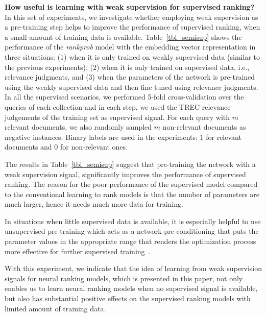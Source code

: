 \documentclass[sigconf]{acmart}
\newcommand{\modelthree}{\textit{rank\-prob} model\xspace}
\newcommand{\feedthree}{embedding vector representation\xspace}
\def\:{\hskip0pt} %
\newcommand{\mypar}[1]{\vspace*{-0.1ex}\medskip\noindent\textbf{#1}~}
\newcommand{\alexi}[1]{\textcolor{cyan}{{\bf [Alexi: }{\em #1}{\bf ]}}}
\begin{document}
\mypar{How useful is learning with weak supervision for supervised ranking?}
%
In this set of experiments, we investigate whether employing weak supervision as a pre-training step helps to improve the performance of supervised ranking, when a small amount of training data is available. Table~\ref{tbl_semisup} shows the performance of the \modelthree with the \feedthree in three situations: (1) when it is only trained on weakly supervised data (similar to the previous experiments), (2) when it is only trained on supervised data, i.e., relevance judgments, and (3) when the parameters of the network is pre-trained using the weakly supervised data and then fine tuned using relevance judgments.
%
In all the supervised scenarios, we performed 5-fold cross-\:validation over the queries of each collection and in each step, we used the TREC relevance judgements of the training set as supervised signal. For each query with $m$ relevant documents, we also randomly sampled $m$ non-relevant documents as negative instances. Binary labels are used in the experiments: $1$ for relevant documents and $0$ for non-relevant ones.

The results in Table~\ref{tbl_semisup} suggest that pre-training the network with a weak supervision signal, significantly improves the performance of supervised ranking.
%
The reason for the poor performance of the supervised model compared to the conventional learning to rank models is that the number of parameters are much larger, hence it needs much more data for training.

In situations when little supervised data is available, it is especially helpful to use unsupervised pre-training which acts as a network pre-conditioning that puts the parameter values in the appropriate range that renders the optimization process more effective for further supervised training~\citep{Rrhan:2010}.

With this experiment, we indicate that the idea of learning from weak supervision signals for neural ranking models, which is presented in this paper, not only enables us to learn neural ranking models when no supervised signal is available, but also has substantial positive effects on the supervised ranking models with limited amount of training data. 
\end{document}
